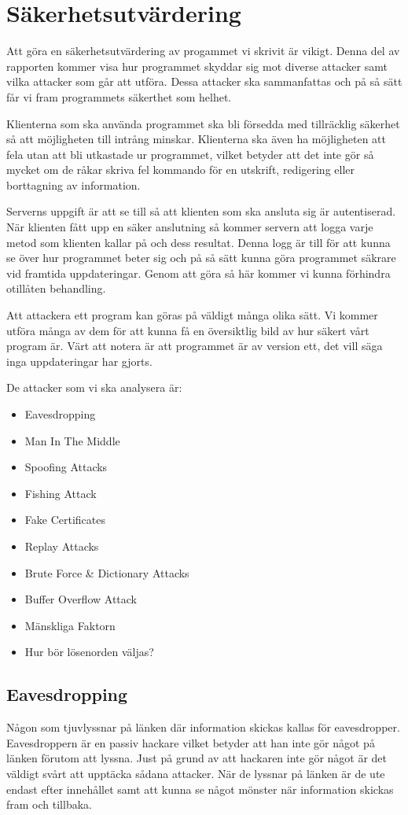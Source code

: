 \section{Säkerhetsutvärdering}
Att göra en säkerhetsutvärdering av progammet vi skrivit är vikigt. Denna del av rapporten kommer visa hur programmet skyddar sig mot diverse attacker samt vilka attacker som går att utföra. Dessa attacker ska sammanfattas och på så sätt får vi fram programmets säkerthet som helhet. 

Klienterna som ska använda programmet ska bli försedda med tillräcklig säkerhet så att möjligheten till intrång minskar. Klienterna ska även ha möjligheten att fela utan att bli utkastade ur programmet, vilket betyder att det inte gör så mycket om de råkar skriva fel kommando för en utskrift, redigering eller borttagning av information.

Serverns uppgift är att se till så att klienten som ska ansluta sig är autentiserad. När klienten fått upp en säker anslutning så kommer servern att logga varje metod som klienten kallar på och dess resultat. Denna logg är till för att kunna se över hur programmet beter sig och på så sätt kunna göra programmet säkrare vid framtida uppdateringar. Genom att göra så här kommer vi kunna förhindra otillåten behandling.

Att attackera ett program kan göras på väldigt många olika sätt. Vi kommer utföra många av dem för att kunna få en översiktlig bild av hur säkert vårt program är. Värt att notera är att programmet är av version ett, det vill säga inga uppdateringar har gjorts. 

De attacker som vi ska analysera är:

\begin{itemize}
\item{Eavesdropping}
\item{Man In The Middle}
\item{Spoofing Attacks}
\item{Fishing Attack}
\item{Fake Certificates}
\item{Replay Attacks}
\item{Brute Force \& Dictionary Attacks}
\item{Buffer Overflow Attack}
\item{Mänskliga Faktorn}
\item{Hur bör lösenorden väljas?}
\end{itemize}

\subsection{Eavesdropping}
Någon som tjuvlyssnar på länken där information skickas kallas för eavesdropper. Eavesdroppern är en passiv hackare vilket betyder att han inte gör något på länken förutom att lyssna. Just på grund av att hackaren inte gör något är det väldigt svårt att upptäcka sådana attacker. När de lyssnar på länken är de ute endast efter innehållet samt att kunna se något mönster när information skickas fram och tillbaka.

